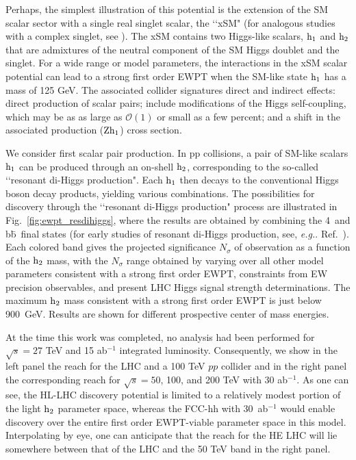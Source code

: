 Perhaps, the simplest illustration of this potential is the extension of the SM scalar sector with a single real singlet scalar\cite{Espinosa:1993bs,Choi:1993cv,Ham:2004cf,Profumo:2007wc,Cline:2012hg,Espinosa:2011ax,No:2013wsa,Curtin:2014jma,Kotwal:2016tex,Brauner:2016fla,Huang:2016cjm,Chen:2017qcz,Huang:2017jws}, the \lq\lq xSM" \cite{Barger:2007im} (for analogous studies with a complex singlet, see \cite{Jiang:2015cwa,Chiang:2017nmu}). 
The xSM contains two Higgs-like scalars, $\rm h_{1}$ and $\rm h_{2}$ that are admixtures of the neutral component of the SM Higgs doublet and the singlet. For a wide range or model parameters, the interactions in the xSM scalar potential can  lead to a strong first order EWPT when the SM-like state $\rm h_1$ has a mass of 125 GeV. The associated collider signatures direct and indirect effects:  direct production of scalar pairs; include modifications of the Higgs self-coupling, which may be as as large as $\mathcal{O}(1)$ or small as a few percent; and a shift in the associated production ($\rm Zh_1$) cross section. 

We consider first scalar pair production. In pp collisions, a pair of SM-like scalars $\rm h_1$ can be produced through an on-shell $\rm h_2$, corresponding to the so-called \lq\lq resonant di-Higgs production".  Each $\rm h_1$ then decays to the conventional Higgs boson decay products, yielding various combinations. The possibilities for discovery through the  \lq\lq resonant di-Higgs production" process are illustrated in Fig.~\ref{fig:ewpt_resdihiggs}, where the results are obtained by combining the 4\texttau\ and b\={b}\textgamma\textgamma\ final states\cite{Kotwal:2016tex} (for early studies of resonant di-Higgs production, see, {\it e.g.}. Ref.~\cite{Baur:2003gp}). Each colored band gives the projected significance $N_\sigma$ of observation as a function of the $\rm h_2$ mass, with the $N_\sigma$ range obtained by varying over all other model parameters consistent with a strong first order EWPT, constraints from EW precision observables, and present LHC Higgs signal strength determinations.  The maximum $\rm h_2$ mass consistent with a strong first order EWPT is just below 900~GeV.  Results are shown for different prospective center of mass energies.

At the time this work was completed, no analysis had been performed for $\sqrt{s} = 27 $ TeV and 15 ab$^{-1}$ integrated luminosity. Consequently, we show in the left panel the reach for the LHC and a 100 TeV $pp$ collider and in the right panel the corresponding reach for $\sqrt{s} = 50$, 100, and 200 TeV with 30 ab$^{-1}$. As one can see, the HL-LHC discovery potential is limited to a relatively modest portion of the light $\rm h_2$ parameter space, whereas the FCC-hh with 30~ab$^{-1}$ would enable discovery over the entire first order EWPT-viable parameter space in this model. Interpolating by eye, one can anticipate that the reach for the HE LHC will lie somewhere between that of the LHC and the 50 TeV band in the right panel. 

